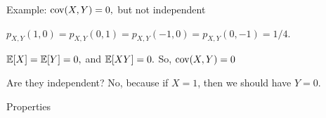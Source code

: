 \documentclass[handout,fleqn,aspectratio=169]{beamer}
\begin{document}
\begin{frame}{Example: $\text{cov}( X,Y )=0,$ but not independent}

\plitemsep 0.1in

\bci 

\item $p_{X,Y}(1,0) = p_{X,Y}(0,1) = p_{X,Y}(-1,0) = p_{X,Y}(0,-1) = 1/4.$

\item<2-> $\mathbb{E}[ X ] = \mathbb{E}[ Y ]=0,$ and $\mathbb{E}[ XY ]=0.$ So, $\text{cov}( X,Y )=0$

\item<3-> Are they independent? No, because if $X=1$, then we should have $Y=0.$

\eci
\centering
{}
\end{frame}

\begin{frame}{Properties}

\plitemsep 0.07in

\vspace{-0.3in}
\bci []

\item<2-> 

\item<3-> 

\item<4->  

\item<5-> 
\eci

\end{frame}
\end{document}
